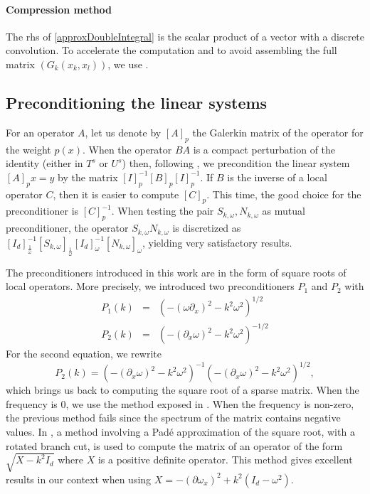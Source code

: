 \documentclass[a4paper]{article}
\begin{document}
\paragraph{Compression method} The rhs of \eqref{approxDoubleIntegral} is the scalar product of a vector with a discrete convolution. To accelerate the computation and to avoid assembling the full matrix $(G_k(x_k,x_l))$, we use . 

\subsection{Preconditioning the linear systems}

For an operator $A$, let us denote by $\left[A\right]_p$ the Galerkin matrix of the operator for the weight $p(x)$. When the operator $BA$ is a compact perturbation of the identity (either in $T^s$ or $U^s$) then, following \cite{steinbach1998construction}, we precondition the linear system $\left[A\right]_p x = y$ by the matrix $\left[I\right]^{-1}_p \left[B\right]_p \left[I\right]_p^{-1}$. If $B$ is the inverse of a local operator $C$, then it is easier to compute $\left[C\right]_p$. This time, the good choice for the preconditioner is $\left[C\right]_p^{-1}$. When testing the pair $S_{k,\omega}, N_{k,\omega}$ as mutual preconditioner, the operator $S_{k,\omega}N_{k,\omega}$ is discretized as $\left[I_d\right]_\frac{1}{\omega}^{-1} \left[S_{k,\omega}\right]_\frac{1}{\omega}\left[I_d\right]_{\omega}^{-1}\left[N_{k,\omega}\right]_\omega$, yielding very satisfactory results. 

The preconditioners introduced in this work are in the form of square roots of local operators. More precisely, we introduced two preconditioners $P_1$ and $P_2$ with 
\begin{eqnarray*}
	P_1(k) &=& \left(-(\omega \partial_x)^2 - k^2 \omega^2\right)^{1/2}\\
	P_2(k) &=& \left(-(\partial_x \omega)^2 - k^2 \omega^2 \right)^{-1/2}
\end{eqnarray*}
For the second equation, we rewrite 
\[P_2(k) = \left(-(\partial_x \omega)^2 - k^2 \omega^2 \right)^{-1} \left(-(\partial_x \omega)^2 - k^2 \omega^2 \right)^{1/2},\]
which brings us back to computing the square root of a sparse matrix. When the frequency is $0$, we use the method exposed in \cite{hale2008computing}. When the frequency is non-zero, the previous method fails since the spectrum of the matrix contains negative values. In \cite{antoine2007generalized}, a method involving a Padé approximation of the square root, with a rotated branch cut, is used to compute the matrix of an operator of the form $\sqrt{X - k^2 I_d}$ where $X$ is a positive definite operator. This method gives excellent results in our context when using $X = -(\partial \omega_x)^2 + k^2 \left(I_d - \omega^2\right)$. 
\end{document}
